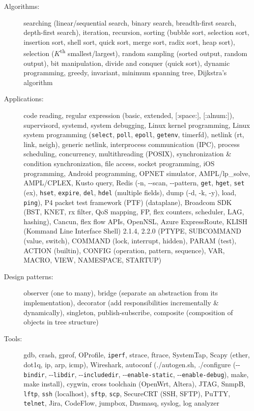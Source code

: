 \documentclass[letterpaper,11pt]{article}
\begin{document}
\begin{description}
\item[Algorithms:] searching (linear/sequential search, binary search, breadth-first search, depth-first search), iteration, recursion,
sorting (bubble sort, selection sort, insertion sort, shell sort, quick sort, merge sort, radix sort, heap sort),
selection ($K$\textsuperscript{th} smallest/largest),
random sampling (sorted output, random output),
bit manipulation, divide and conquer (quick sort), dynamic programming, greedy, invariant, minimum spanning tree, Dijkstra's algorithm

\item[Applications:] code reading, regular expression (basic, extended, [:space:], [:alnum:]),
supervisord, systemd, system debugging, Linux kernel programming,
Linux system programming ({\tt select}, {\tt poll}, {\tt epoll}, {\tt getenv}, timerfd), netlink (rt, link, neigh), generic netlink,
interprocess communication (IPC), process scheduling,
concurrency, multithreading (POSIX), synchronization \& condition synchronization,
file access, socket programming,
%
iOS programming, Android programming,
OPNET simulator, AMPL/lp\_solve, AMPL/CPLEX, Kusto query,
%
Redis (-n, -{}-scan, -{}-pattern, {\tt get}, {\tt hget}, {\tt set} (ex), {\tt hset}, {\tt expire}, {\tt del}, {\tt hdel} (multiple fields),
dump (-d, -k, -y), load, {\tt ping}),
%
P4 packet test framework (PTF) (dataplane),
Broadcom SDK (BST, KNET, rx filter, QoS mapping, FP, flex counters, scheduler, LAG, hashing), Cancun, flex flow APIs, OpenNSL,
Azure ExpressRoute,
%
KLISH (Kommand Line Interface Shell) 2.1.4, 2.2.0 (PTYPE, SUBCOMMAND (value, switch), COMMAND (lock, interrupt, hidden), PARAM (test),
ACTION (builtin),
CONFIG (operation, pattern, sequence),
VAR, MACRO, VIEW, NAMESPACE, STARTUP)

\item[Design patterns:] observer (one to many), bridge (separate an abstraction from its implementation),
decorator (add responsibilities incrementally \& dynamically), singleton, publish-subscribe, composite (composition of objects in tree structure)

\item[Tools:] gdb, crash, gprof, OProfile, {\tt iperf},
strace, ftrace, SystemTap,
Scapy (ether, dot1q, ip, arp, icmp), Wireshark, autoconf (./autogen.sh,
./configure (-{}-{\tt bindir}, -{}-{\tt libdir}, -{}-{\tt includedir}, -{}-{\tt enable-static}, -{}-{\tt enable-debug}),
make, make install), cygwin, cross toolchain (OpenWrt, Altera),
JTAG, SnmpB,
{\tt lftp}, {\tt ssh} (localhost), {\tt sftp}, {\tt scp}, SecureCRT (SSH, SFTP), PuTTY, {\tt telnet},
Jira, CodeFlow,
jumpbox, Dnsmasq, syslog, log analyzer


\end{description}
\end{document}
